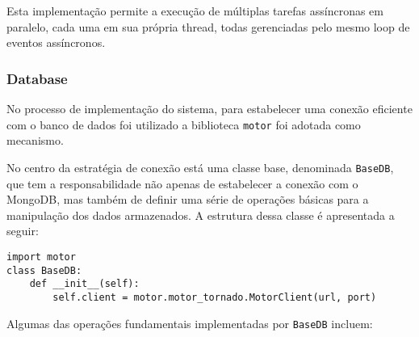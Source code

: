 Esta implementação permite a execução de múltiplas tarefas assíncronas em paralelo, cada uma em sua própria thread, todas gerenciadas pelo mesmo loop de eventos assíncronos.

\subsubsection{Database}\label{subsubsec:DatabaseImpl}
No processo de implementação do sistema, para estabelecer uma conexão eficiente com o banco de dados foi utilizado a biblioteca \texttt{motor} \cite{motorDocs} foi adotada como mecanismo.

No centro da estratégia de conexão está uma classe base, denominada \texttt{BaseDB}, que tem a responsabilidade não apenas de estabelecer a conexão com o MongoDB, mas também de definir uma série de operações básicas para a manipulação dos dados armazenados. A estrutura dessa classe é apresentada a seguir:

\begin{verbatim}
import motor
class BaseDB:
    def __init__(self):
        self.client = motor.motor_tornado.MotorClient(url, port)
\end{verbatim}

Algumas das operações fundamentais implementadas por \texttt{BaseDB} incluem:

